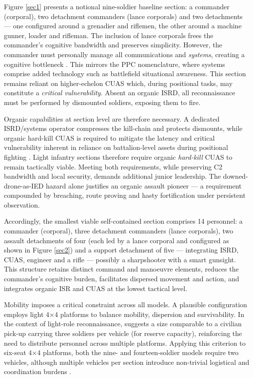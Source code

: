 Figure \ref{sec1} presents a notional nine-soldier baseline section: a commander (corporal), two detachment commanders (lance corporals) and two detachments --- one configured around a grenadier and riflemen, the other around a machine gunner, loader and rifleman. The inclusion of lance corporals frees the commander's cognitive bandwidth and preserves simplicity. However, the commander must personally manage all communications and \textit{systems}, creating a cognitive bottleneck \parencite{stu_lyle_participant_11}. This mirrors the PPC nomenclature, where systems comprise added technology such as battlefield situational awareness. This section remains reliant on higher-echelon CUAS which, during positional tasks, may constitute a \textit{critical vulnerability}. Absent an organic ISRD, all reconnaissance must be performed by dismounted soldiers, exposing them to fire.

Organic capabilities at section level are therefore necessary. A dedicated ISRD/systems operator compresses the kill-chain and protects dismounts, while organic hard-kill CUAS is required to mitigate the latency and critical vulnerability inherent in reliance on battalion-level assets during positional fighting \parencite[28]{WATLING_2024}. Light infantry sections therefore require organic \textit{hard-kill} CUAS to remain tactically viable. Meeting both requirements, while preserving C2 bandwidth and local security, demands additional junior leadership. The downed-drone-as-IED hazard alone justifies an organic assault pioneer --- a requirement compounded by breaching, route proving and hasty fortification under persistent observation.

Accordingly, the smallest viable self-contained section comprises 14 personnel: a commander (corporal), three detachment commanders (lance corporals), two assault detachments of four (each led by a lance corporal and configured as shown in Figure \ref{sec2}) and a  support detachment of five --- integrating ISRD, CUAS, engineer and a rifle --- possibly a sharpshooter with a smart gunsight. This structure retains distinct command and manoeuvre elements, reduces the commander's cognitive burden, facilitates dispersed movement and action, and integrates organic ISR and CUAS at the lowest tactical level.

Mobility imposes a critical constraint across all models. A plausible configuration employs light 4$\times$4 platforms to balance mobility, dispersion and survivability. In the context of light-role reconnaissance, \textcite[~112--113]{Watling_book} suggests a size comparable to a civilian pick-up carrying three soldiers per vehicle (for reserve capacity), reinforcing the need to distribute personnel across multiple platforms. Applying this criterion to six-seat 4$\times$4 platforms, both the nine- and fourteen-soldier models require two vehicles, although multiple vehicles per section introduce non-trivial logistical and coordination burdens \parencite{stu_lyle_participant_11}.

